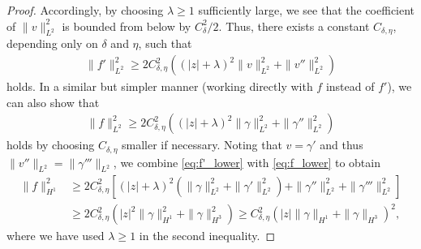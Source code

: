 \documentclass[10pt,a4paper]{amsart}
\begin{document}
\begin{proof}
Accordingly, by choosing $\lambda\ge1$ sufficiently large, we see that the coefficient of $\|v\|_{L^2}^2$ is bounded from below by $C_\delta^2/2$.
Thus, there exists a constant $C_{\delta,\eta}$, depending only on $\delta$ and $\eta$, such that
\begin{align}
    \|f'\|_{L^2}^2 \ge 2C_{\delta,\eta}^2\left((|z|+\lambda)^2\|v\|_{L^2}^2 + \|v''\|_{L^2}^2\right)
    \label{eq:f'_lower}
\end{align}
holds.
In a similar but simpler manner (working directly with $f$ instead of $f'$), we can also show that
\begin{align}
    \|f\|_{L^2}^2 \ge 2C_{\delta,\eta}^2\left((|z|+\lambda)^2\|\gamma\|_{L^2}^2 + \|\gamma''\|_{L^2}^2\right)
    \label{eq:f_lower}
\end{align}
holds by choosing $C_{\delta,\eta}$ smaller if necessary.
Noting that $v=\gamma'$ and thus $\|v''\|_{L^2} = \|\gamma'''\|_{L^2}$, we combine \eqref{eq:f'_lower} with \eqref{eq:f_lower} to obtain
\begin{align*}
    \|f\|_{H^1}^2
    &\ge2C_{\delta,\eta}^2\left[(|z|+\lambda)^2(\|\gamma\|_{L^2}^2 + \|\gamma'\|_{L^2}^2) + \|\gamma''\|_{L^2}^2 + \|\gamma'''\|_{L^2}^2\right]\\
    &\ge2C_{\delta,\eta}^2\left(|z|^2\|\gamma\|_{H^1}^2 + \|\gamma\|_{H^3}^2\right)
    \ge C_{\delta,\eta}^2\left(|z|\|\gamma\|_{H^1} + \|\gamma\|_{H^3}\right)^2,
\end{align*}
where we have used $\lambda\ge1$ in the second inequality.
\end{proof}
\end{document}
